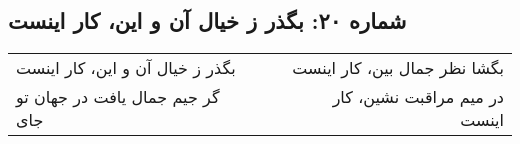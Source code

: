 \begin{center}
\section*{شماره ۲۰: بگذر ز خیال آن و این، کار اینست}
\label{sec:020}
\begin{longtable}{l p{0.5cm} r}
بگذر ز خیال آن و این، کار اینست
&&
بگشا نظر جمال بین، کار اینست
\\
گر جیم جمال یافت در جهان تو جای
&&
در میم مراقبت نشین، کار اینست
\\
\end{longtable}
\end{center}
